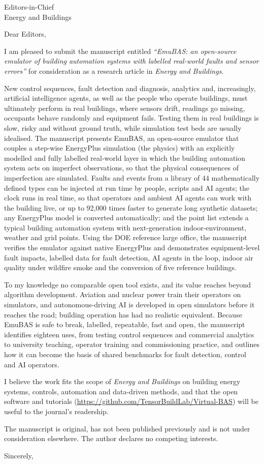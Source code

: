 \documentclass[11pt]{letter}
\begin{document}
\begin{letter}{Editors-in-Chief\\Energy and Buildings}
\opening{Dear Editors,}

I am pleased to submit the manuscript entitled \emph{``EmuBAS: an open-source emulator of building automation
systems with labelled real-world faults and sensor errors''} for consideration as a research
article in \emph{Energy and Buildings}.

New control sequences, fault detection and diagnosis, analytics and, increasingly, artificial intelligence agents, as
well as the people who operate buildings, must ultimately perform in real buildings, where sensors drift, readings go
missing, occupants behave randomly and equipment fails. Testing them in real buildings is slow, risky and without
ground truth, while simulation test beds are usually idealised. The manuscript presents EmuBAS, an open-source
emulator that couples a step-wise EnergyPlus simulation (the physics) with an explicitly modelled and fully labelled
real-world layer in which the building automation system acts on imperfect observations, so that the physical
consequences of imperfection are simulated. Faults and events from a library of 44 mathematically defined types can be
injected at run time by people, scripts and AI agents; the clock runs in real time, so that operators and ambient AI
agents can work with the building live, or up to 92,000 times faster to generate long synthetic datasets; any
EnergyPlus model is converted automatically; and the point list extends a typical building automation system with
next-generation indoor-environment, weather and grid points. Using the DOE reference large office, the manuscript
verifies the emulator against native EnergyPlus and demonstrates equipment-level fault impacts, labelled data for
fault detection, AI agents in the loop, indoor air quality under wildfire smoke and the conversion of five reference
buildings.

To my knowledge no comparable open tool exists, and its value reaches beyond algorithm development. Aviation and
nuclear power train their operators on simulators, and autonomous-driving AI is developed in open simulators before it
reaches the road; building operation has had no realistic equivalent. Because EmuBAS is safe to break, labelled,
repeatable, fast and open, the manuscript identifies eighteen uses, from testing control sequences and commercial
analytics to university teaching, operator training and commissioning practice, and outlines how it can become the
basis of shared benchmarks for fault detection, control and AI operators.

I believe the work fits the scope of \emph{Energy and Buildings} on building energy systems, controls, automation and
data-driven methods, and that the open software and tutorials (\url{https://github.com/TensorBuildLab/Virtual-BAS})
will be useful to the journal's readership.

The manuscript is original, has not been published previously and is not under consideration elsewhere. The author
declares no competing interests.

\closing{Sincerely,}
\end{letter}
\end{document}
